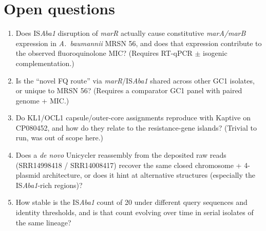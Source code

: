 \documentclass[11pt]{article}
\begin{document}
\section{Open questions}
\begin{enumerate}[leftmargin=1.5em]
\item Does IS\emph{Aba1} disruption of \emph{marR} actually cause constitutive \emph{marA/marB} expression in \emph{A.\ baumannii} MRSN 56, and does that expression contribute to the observed fluoroquinolone MIC? (Requires RT-qPCR $\pm$ isogenic complementation.)
\item Is the ``novel FQ route'' via \emph{marR}/IS\emph{Aba1} shared across other GC1 isolates, or unique to MRSN 56? (Requires a comparator GC1 panel with paired genome + MIC.)
\item Do KL1/OCL1 capsule/outer-core assignments reproduce with Kaptive on CP080452, and how do they relate to the resistance-gene islands? (Trivial to run, was out of scope here.)
\item Does a \emph{de novo} Unicycler reassembly from the deposited raw reads (SRR14998418 / SRR14008417) recover the same closed chromosome + 4-plasmid architecture, or does it hint at alternative structures (especially the IS\emph{Aba1}-rich regions)?
\item How stable is the IS\emph{Aba1} count of 20 under different query sequences and identity thresholds, and is that count evolving over time in serial isolates of the same lineage?
\end{enumerate}
\end{document}
